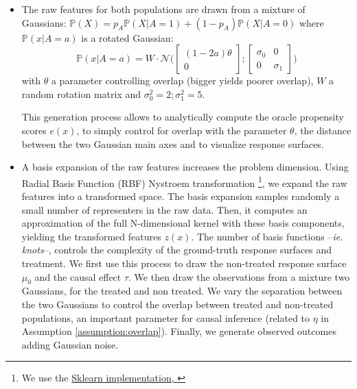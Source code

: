 \documentclass[a4paper,num-refs]{oup-contemporary}%
\begin{document}
\begin{itemize}
    \item The raw features for both populations are drawn from a mixture of
          Gaussians:
          $\mathbb P(X) = p_A \mathbb P(X|A=1) + (1- p_A) \mathbb P(X|A=0)$
          where $\mathbb P(x|A=a)$ is a rotated Gaussian:
          \begin{equation}
              \mathbb P(x|A=a) = W \cdot \mathcal N \Big( \begin{bmatrix} (1-2a) \theta \\ 0\end{bmatrix} ; \begin{bmatrix} \sigma_0 & 0 \\ 0 & \sigma_1\end{bmatrix} \Big)
          \end{equation}
          with $\theta$ a parameter controlling overlap (bigger yields poorer
          overlap), $W$ a random rotation matrix and $\sigma_0^2=2;\sigma_1^2=5$.

          This generation process allows to analytically compute the oracle
          propensity scores $e(x)$, to simply control for overlap with the
          parameter $\theta$, the distance between the two Gaussian main axes and
          to  visualize response surfaces.

    \item A basis expansion of the raw features increases the problem dimension.
          Using Radial Basis Function (RBF) Nystroem transformation \footnote{We
              use the
              \href{https://scikit-learn.org/stable/modules/generated/sklearn.kernel_approximation.Nystroem.html}{Sklearn
                  implementation, \cite{pedregosa_scikitlearn_2011}}}, we expand the raw
          features into a transformed space. The basis expansion samples
          randomly a small number of representers in the raw data. Then,  it
          computes an approximation of the full N-dimensional kernel with these
          basis components, yielding the transformed features $z(x)$. The number
          of basis functions --\emph{ie. knots}--, controls the complexity of
          the ground-truth response surfaces and treatment. We first use this
          process to draw the non-treated response surface $\mu_0$ and the
          causal effect $\tau$. We then draw the observations from a mixture two
          Gaussians, for the treated and non treated. We vary the separation
          between the two Gaussians to control the overlap between treated and
          non-treated populations, an important parameter for causal inference
          (related to $\eta$ in Assumption
          \ref{assumption:overlap}). Finally, we generate observed
          outcomes adding Gaussian noise.


\end{itemize}
\end{document}
